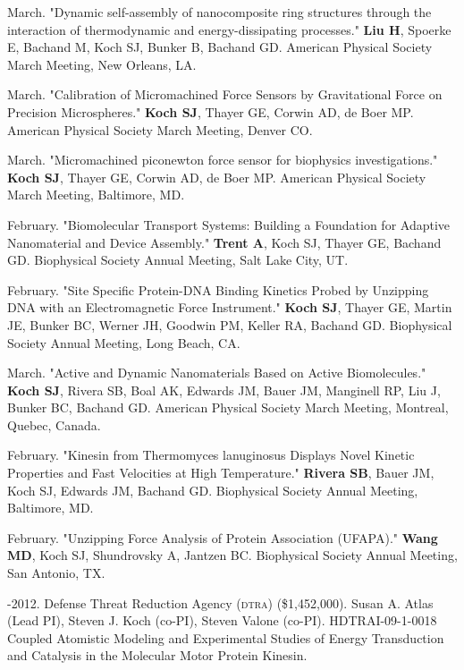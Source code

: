 \documentclass[11pt]{article}
\begin{document}
 March. "Dynamic self-assembly of nanocomposite ring structures through the interaction of thermodynamic and energy-dissipating processes." \textbf{Liu H}, Spoerke E, Bachand M, Koch SJ, Bunker B, Bachand GD.  American Physical Society March Meeting, New Orleans, LA.

 March. "Calibration of Micromachined Force Sensors by Gravitational Force on Precision Microspheres." \textbf{Koch SJ}, Thayer GE, Corwin AD, de Boer MP. American Physical Society March Meeting, Denver CO.

 March. "Micromachined piconewton force sensor for biophysics investigations." \textbf{Koch SJ}, Thayer GE, Corwin AD, de Boer MP. American Physical Society March Meeting, Baltimore, MD.

 February. "Biomolecular Transport Systems: Building a Foundation for Adaptive Nanomaterial and Device Assembly." \textbf{Trent A}, Koch SJ, Thayer GE, Bachand GD. Biophysical Society Annual Meeting, Salt Lake City, UT.

 February. "Site Specific Protein-DNA Binding Kinetics Probed by Unzipping DNA with an Electromagnetic Force Instrument." \textbf{Koch SJ}, Thayer GE, Martin JE, Bunker BC, Werner JH, Goodwin PM, Keller RA, Bachand GD. Biophysical Society Annual Meeting, Long Beach, CA.

 March. "Active and Dynamic Nanomaterials Based on Active Biomolecules." \textbf{Koch SJ}, Rivera SB, Boal AK, Edwards JM, Bauer JM, Manginell RP, Liu J, Bunker BC, Bachand GD. American Physical Society March Meeting, Montreal, Quebec, Canada.

 February. "Kinesin from Thermomyces lanuginosus Displays Novel Kinetic Properties and Fast Velocities at High Temperature." \textbf{Rivera SB}, Bauer JM, Koch SJ, Edwards JM, Bachand GD. Biophysical Society Annual Meeting, Baltimore, MD.

 February. "Unzipping Force Analysis of Protein Association (UFAPA)." \newline \textbf{Wang MD}, Koch SJ, Shundrovsky A, Jantzen BC. Biophysical Society Annual Meeting, San Antonio, TX.

\bigskip

\medskip
  
-2012. Defense Threat Reduction Agency (\textsc{dtra}) (\$1,452,000). Susan A. Atlas (Lead PI), Steven J. Koch (co-PI), Steven Valone (co-PI). HDTRAI-09-1-0018 Coupled Atomistic Modeling and Experimental Studies of Energy Transduction and Catalysis in the Molecular Motor Protein Kinesin.
\end{document}
